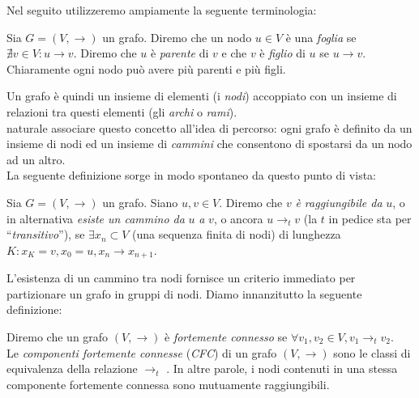 Nel seguito utilizzeremo ampiamente la seguente terminologia:
\begin{definition}
    Sia $G = (V,\to)$ un grafo. Diremo che un nodo $u \in V$ è una \emph{foglia} se $\nexists v \in V : u \to v$. Diremo che $u$ è \emph{parente} di $v$ e che $v$ è \emph{figlio} di $u$ se $u \to v$. Chiaramente ogni nodo può avere più parenti e più figli.
\end{definition}
Un grafo è quindi un insieme di elementi (i \emph{nodi}) accoppiato con un insieme di relazioni tra questi elementi (gli \emph{archi} o \emph{rami}).\\
\accente naturale associare questo concetto all'idea di percorso: ogni grafo è definito da un insieme di nodi ed un insieme di \emph{cammini} che consentono di spostarsi da un nodo ad un altro.\\
La seguente definizione sorge in modo spontaneo da questo punto di vista:
\begin{definition}
    Sia $G = (V, \to)$ un grafo. Siano $u,v \in V$. Diremo che $v$ \emph{è raggiungibile da} $u$, o in alternativa \emph{esiste un cammino da} $u$ \emph{a} $v$, o ancora $u \to_t v$ (la $t$ in pedice sta per ``\emph{transitivo}''), se
    $\exists x_n \subset V$ (una sequenza finita di nodi) di lunghezza $K : x_K = v, x_0 = u, x_n \to x_{n+1}$.
\end{definition}
L'esistenza di un cammino tra nodi fornisce un criterio immediato per partizionare un grafo in gruppi di nodi. Diamo innanzitutto la seguente definizione:
\begin{definition}
    Diremo che un grafo $(V,\to)$ è \emph{fortemente connesso} se $\forall v_1, v_2 \in V, v_1 \to_t v_2$.\\
    Le \emph{componenti fortemente connesse} (\emph{CFC}) di un grafo $(V,\to)$ sono le classi di equivalenza della relazione $\to_t$ \cite[Appendice B]{clrs}. In altre parole, i nodi contenuti in una stessa componente fortemente connessa sono mutuamente raggiungibili.
\end{definition}
